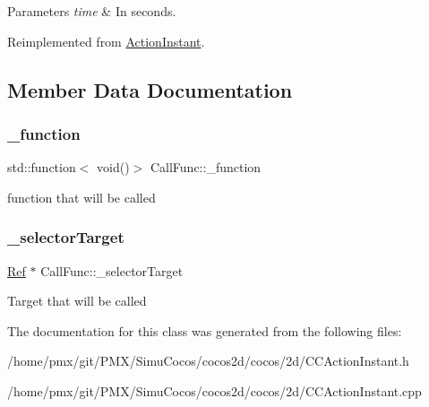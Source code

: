 \begin{DoxyParams}{Parameters}
{\em time} & In seconds. \\
\hline
\end{DoxyParams}


Reimplemented from \hyperlink{classActionInstant_a59875bf08cd1f58c0c8c6693ac540ade}{Action\+Instant}.



\subsection{Member Data Documentation}
\mbox{\label{classCallFunc_a7addb2ce818527caf7ae440a3a4abe23}} 
\subsubsection{\texorpdfstring{\+\_\+function}{\_function}}
{\footnotesize\ttfamily std\+::function$<$ void()$>$ Call\+Func\+::\+\_\+function\hspace{0.3cm}{\ttfamily [protected]}}

function that will be called \mbox{\label{classCallFunc_a4d863ca8d69741dd4904afbf90dba449}} 
\subsubsection{\texorpdfstring{\+\_\+selector\+Target}{\_selectorTarget}}
{\footnotesize\ttfamily \hyperlink{classRef}{Ref} $\ast$ Call\+Func\+::\+\_\+selector\+Target\hspace{0.3cm}{\ttfamily [protected]}}

Target that will be called 

The documentation for this class was generated from the following files\+:\begin{DoxyCompactItemize}
\item 
/home/pmx/git/\+P\+M\+X/\+Simu\+Cocos/cocos2d/cocos/2d/C\+C\+Action\+Instant.\+h\item 
/home/pmx/git/\+P\+M\+X/\+Simu\+Cocos/cocos2d/cocos/2d/C\+C\+Action\+Instant.\+cpp\end{DoxyCompactItemize}
